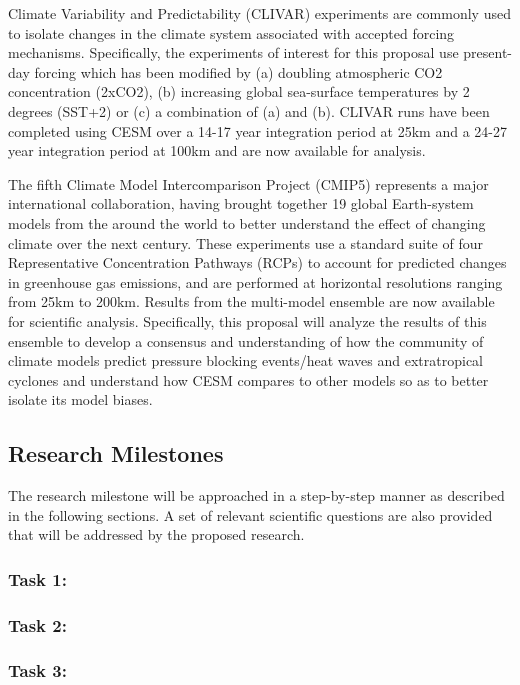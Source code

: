 \documentclass[11pt]{article}
\begin{document}
Climate Variability and Predictability (CLIVAR) experiments are commonly used to isolate changes in the climate system associated with accepted forcing mechanisms.  Specifically, the experiments of interest for this proposal use present-day forcing which has been modified by (a) doubling atmospheric CO2 concentration (2xCO2), (b) increasing global sea-surface temperatures by 2 degrees (SST+2) or (c) a combination of (a) and (b).  CLIVAR runs have been completed using CESM over a 14-17 year integration period at 25km and a 24-27 year integration period at 100km and are now available for analysis.

The fifth Climate Model Intercomparison Project (CMIP5) represents a major international collaboration, having brought together 19 global Earth-system models from the around the world to better understand the effect of changing climate over the next century.  These experiments use a standard suite of four Representative Concentration Pathways (RCPs) to account for predicted changes in greenhouse gas emissions, and are performed at horizontal resolutions ranging from 25km to 200km.  Results from the multi-model ensemble are now available for scientific analysis.  Specifically, this proposal will analyze the results of this ensemble to develop a consensus and understanding of how the community of climate models predict pressure blocking events/heat waves and extratropical cyclones and understand how CESM compares to other models so as to better isolate its model biases.

\subsection{Research Milestones} \label{sec:ResearchMilestones}

The research milestone will be approached in a step-by-step manner as described in the following sections.  A set of relevant scientific questions are also provided that will be addressed by the proposed research.

\subsubsection{Task 1: }

\subsubsection{Task 2: }

\subsubsection{Task 3:}
\end{document}
